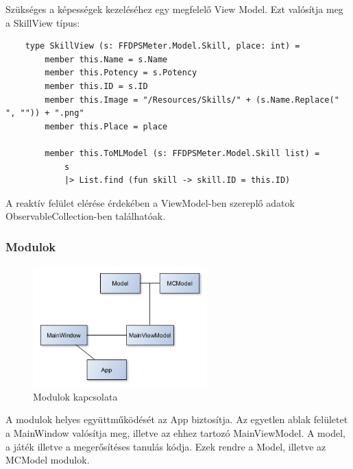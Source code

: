 \documentclass[12pt]{article}
\begin{document}
	Szükséges a képességek kezeléséhez egy megfelelő View Model. Ezt valósítja meg a SkillView típus:
	
	\begin{lstlisting}
	type SkillView (s: FFDPSMeter.Model.Skill, place: int) =
		member this.Name = s.Name
		member this.Potency = s.Potency
		member this.ID = s.ID
		member this.Image = "/Resources/Skills/" + (s.Name.Replace(" ", "")) + ".png"
		member this.Place = place
	
		member this.ToMLModel (s: FFDPSMeter.Model.Skill list) =
			s
			|> List.find (fun skill -> skill.ID = this.ID)
	\end{lstlisting}
	
	A reaktív felület elérése érdekében a ViewModel-ben szereplő adatok ObservableCollection-ben találhatóak.
	
	\subsubsection{Modulok}
	
	\begin{figure}[H]
		\begin{center}
			\includegraphics[width=0.6\textwidth]{viewuml}
		\end{center}
		\caption{Modulok kapcsolata}
		\label{fig:viewuml}
	\end{figure}
	
	A modulok helyes együttműködését az App biztosítja. Az egyetlen ablak felületet a MainWindow valósítja meg, illetve az ehhez tartozó MainViewModel. A model, a játék illetve a megerősítéses tanulás kódja. Ezek rendre a Model, illetve az MCModel modulok.
	
\end{document}

